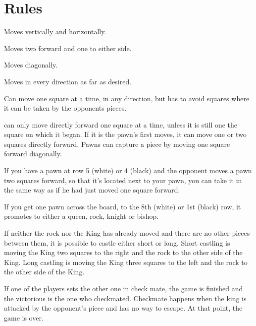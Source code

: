 \documentclass{article}
\begin{document}
\section{Rules}
\begin{description}[align=right]
\item [Rook] \hspace{6mm} Moves vertically and horizontally.
\item [Knight] \hspace{6mm} Moves two forward and one to either side.
\item [Bishop]  \hspace{6mm} Moves diagonally.
\item [Queen] \hspace{6mm} Moves in every direction as far as desired. 
\item [King] \hspace{6mm} Can move one square at a time, in any direction, but has to avoid squares where it can be taken by the opponents pieces.
\item [Pawn] \hspace{6mm} can only move directly forward one square at a time, unless it is still one the square on which it began. If it is the pawn’s first moves, it can move one or two squares directly forward. Pawns can capture a piece by moving one square forward diagonally.
\item [En passant:] \hspace{6mm} If you have a pawn at row 5 (white) or 4 (black) and the opponent moves a pawn two squares forward, so that it’s located next to your pawn, you can take it in the same way as if he had just moved one square forward.
\item [Pawn promotion:] \hspace{6mm} If you get one pawn across the board, to the 8th (white) or 1st (black) row, it promotes to either a queen, rock, knight or bishop.
\item [Castling:] \hspace{6mm} If neither the rock nor the King has already moved and there are no other pieces between them, it is possible to castle either short or long. Short castling is moving the King two squares to the right and the rock to the other side of the King. Long castling is moving the King three squares to the left and the rock to the other side of the King.
\item [Win/loose:] \hspace{6mm} If one of the players sets the other one in check mate, the game is finished and the victorious is the one who checkmated. Checkmate happens when the king is attacked by the opponent's piece and has no way to escape. At that point, the game is over.

\end{description}
\end{document}

